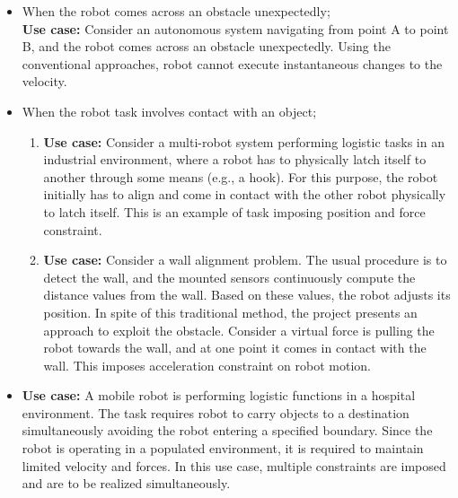 \begin{itemize}
	\item When the robot comes across an obstacle unexpectedly; \\ \textbf{Use case:} Consider an autonomous system navigating from point A to point B, and the robot comes across an obstacle unexpectedly. Using the conventional approaches, robot cannot execute instantaneous changes to the velocity. 
	\item When the robot task involves contact with an object; \begin{enumerate}
		\item \textbf{Use case:} Consider a multi-robot system performing logistic tasks in an industrial environment, where a robot has to physically latch itself to another through some means (e.g., a hook). For this purpose, the robot initially has to align and come in contact with the other robot physically to latch itself. This is an example of task imposing position and force constraint. 
		\item \textbf{Use case:} Consider a wall alignment problem. The usual procedure is to detect the wall, and the mounted sensors continuously compute the distance values from the wall. Based on these values, the robot adjusts its position. In spite of this traditional method, the project presents an approach to exploit the obstacle. Consider a virtual force is pulling the robot towards the wall, and at one point it comes in contact with the wall. This imposes acceleration constraint on robot motion.
	\end{enumerate}
	\item \textbf{Use case:} A mobile robot is performing logistic functions in a hospital environment. The task requires robot to carry objects to a destination simultaneously avoiding the robot entering a specified boundary. Since the robot is operating in a populated environment, it is required to maintain limited velocity and forces. In this use case, multiple constraints are imposed and are to be realized simultaneously. 
	
\end{itemize}

